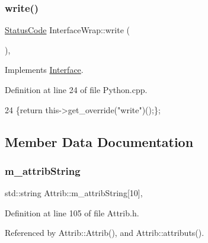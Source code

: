 \subsubsection{\texorpdfstring{write()}{write()}}
{\footnotesize\ttfamily \hyperlink{classStatusCode}{Status\+Code} Interface\+Wrap\+::write (\begin{DoxyParamCaption}\item[{\hyperlink{classIOdata}{I\+Odata} $\ast$}]{ }\end{DoxyParamCaption})\hspace{0.3cm}{\ttfamily [inline]}, {\ttfamily [virtual]}}



Implements \hyperlink{classInterface_ad665cacbaf490a26c1c4ba192022e68a}{Interface}.



Definition at line 24 of file Python.\+cpp.


\begin{DoxyCode}
24 \{\textcolor{keywordflow}{return} this->get\_override(\textcolor{stringliteral}{"write"})();\};
\end{DoxyCode}


\subsection{Member Data Documentation}
\mbox{\label{classAttrib_a3414521d7a82476e874b25a5407b5e63}} 
\subsubsection{\texorpdfstring{m\+\_\+attrib\+String}{m\_attribString}}
{\footnotesize\ttfamily std\+::string Attrib\+::m\+\_\+attrib\+String\mbox{[}10\mbox{]}\hspace{0.3cm}{\ttfamily [protected]}, {\ttfamily [inherited]}}



Definition at line 105 of file Attrib.\+h.



Referenced by Attrib\+::\+Attrib(), and Attrib\+::attributs().

\mbox{\label{classElement_abe3de7a5dbbc9a6dd2d7e012e5fdb266}} 

